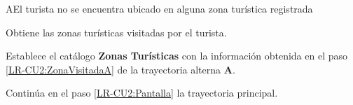 		\begin{UCtrayectoriaA}{A}{El turista no se encuentra ubicado en alguna zona turística registrada}
			
			\UCpaso \label{LR-CU2:ZonaVisitadaA} Obtiene las zonas turísticas visitadas por el turista.
			
			\UCpaso Establece el catálogo \textbf{Zonas Turísticas} con la información obtenida en el paso \ref{LR-CU2:ZonaVisitadaA} de la trayectoria alterna \textbf{A}.
			
			\UCpaso Continúa en el paso \ref{LR-CU2:Pantalla} la trayectoria principal.
			
		\end{UCtrayectoriaA}
	
	